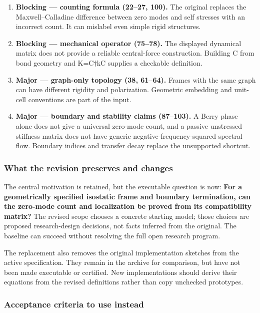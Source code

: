 \documentclass[
  11pt,
]{article}
\begin{document}
\begin{enumerate}
\def\labelenumi{\arabic{enumi}.}
\item
  \textbf{Blocking --- counting formula (22--27, 100).} The original
  replaces the Maxwell--Calladine difference between zero modes and self
  stresses with an incorrect count. It can mislabel even simple rigid
  structures.
\item
  \textbf{Blocking --- mechanical operator (75--78).} The displayed
  dynamical matrix does not provide a reliable central-force
  construction. Building C from bond geometry and
  K=C\ensuremath{\dagger}kC supplies a checkable definition.
\item
  \textbf{Major --- graph-only topology (38, 61--64).} Frames with the
  same graph can have different rigidity and polarization. Geometric
  embedding and unit-cell conventions are part of the input.
\item
  \textbf{Major --- boundary and stability claims (87--103).} A Berry
  phase alone does not give a universal zero-mode count, and a passive
  unstressed stiffness matrix does not have generic
  negative-frequency-squared spectral flow. Boundary indices and
  transfer decay replace the unsupported shortcut.
\end{enumerate}

\subsubsection{What the revision preserves and changes}

The central motivation is retained, but the executable question is now:
\textbf{For a geometrically specified isostatic frame and boundary
termination, can the zero-mode count and localization be proved from its
compatibility matrix?} The revised scope chooses a concrete starting
model; those choices are proposed research-design decisions, not facts
inferred from the original. The baseline can succeed without resolving
the full open research program.

The replacement also removes the original implementation sketches from
the active specification. They remain in the archive for comparison, but
have not been made executable or certified. New implementations should
derive their equations from the revised definitions rather than copy
unchecked prototypes.

\subsubsection{Acceptance criteria to use instead}
\end{document}
